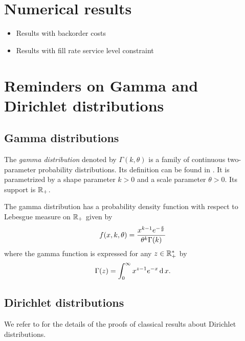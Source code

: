\section{Numerical results}



\begin{itemize}
  \item Results with backorder costs
  \item Results with fill rate service level constraint
\end{itemize}




\section{Reminders on Gamma and Dirichlet distributions}
\label{sec:reminders:gamma-and-dirichlet-distributions}



\subsection{Gamma distributions}

The \emph{gamma distribution} denoted by $\Gamma(k,\theta)$ is a family of continuous two-parameter probability distributions.
Its definition can be found in \cite[Appendix A]{Delmas2006}.
It is parametrized by a shape parameter $k>0$ and a scale parameter $\theta>0$.
Its support is $\mathbb{R}_+$.

The gamma distribution has a probability density function with respect to Lebesgue measure on $\mathbb{R}_+$ given by
\begin{equation}\label{eq:dirchlet:probability-density-function}
  f\bracket{x,k,\theta} = \frac{x^{k-1}e^{-\frac{x}{\theta}}}{ \theta^k\Gamma\bracket{k} }
\end{equation}
where the gamma function is expressed for any $z\in\mathbb{R}_+^*$ by
\begin{equation}
  \Gamma\bracket{z} = \int_0^{\infty} x^{z-1}e^{-x} \diff x.
\end{equation}


\subsection{Dirichlet distributions}

We refer to \cite[Chapter 49]{Kotz2000} for the details of the proofs of classical results about Dirichlet distributions.


